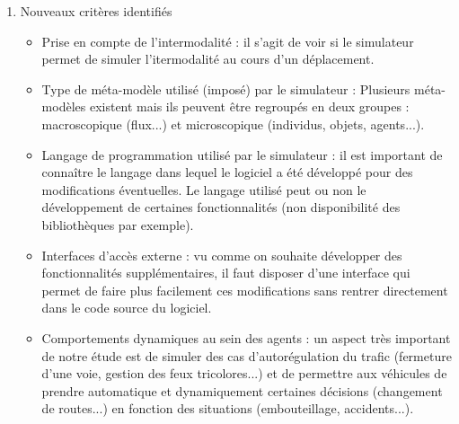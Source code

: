 \begin{enumerate}
    \item Nouveaux critères identifiés
    
        \begin{itemize}
            \item Prise en compte de l'intermodalité : il s'agit de voir si le simulateur permet de simuler l'itermodalité au cours d'un déplacement.
            \item Type de méta-modèle utilisé (imposé) par le simulateur : Plusieurs méta-modèles existent mais ils peuvent être regroupés en deux groupes : macroscopique (flux...) et microscopique (individus, objets, agents...).
            \item Langage de programmation utilisé par le simulateur : il est important de connaître le langage dans lequel le logiciel a été développé pour des modifications éventuelles. Le langage utilisé peut ou non le développement de certaines fonctionnalités (non disponibilité des bibliothèques par exemple).
            \item Interfaces d'accès externe : vu comme on souhaite développer des fonctionnalités supplémentaires, il faut disposer d'une interface qui permet de faire plus facilement ces modifications sans rentrer directement dans le code source du logiciel.
            \item Comportements dynamiques au sein des agents : un aspect très important de notre étude est de simuler des cas d'autorégulation du trafic (fermeture d'une voie, gestion des feux tricolores...) et de permettre aux véhicules de prendre automatique et dynamiquement certaines décisions (changement de routes...) en fonction des situations (embouteillage, accidents...).
        \end{itemize}
\end{enumerate}

 